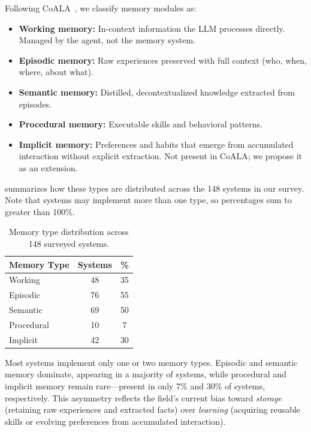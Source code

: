 Following CoALA~\cite{sumers2024coala}, we classify memory modules as:

\begin{itemize}[leftmargin=*, nosep]
    \item \textbf{Working memory:} In-context information the LLM
    processes directly. Managed by the agent, not the memory system.
    \item \textbf{Episodic memory:} Raw experiences preserved with
    full context (who, when, where, about what).
    \item \textbf{Semantic memory:} Distilled, decontextualized
    knowledge extracted from episodes.
    \item \textbf{Procedural memory:} Executable skills and
    behavioral patterns.
    \item \textbf{Implicit memory:} Preferences and habits that
    emerge from accumulated interaction without explicit extraction.
    Not present in CoALA; we propose it as an extension.
\end{itemize}

 summarizes how these types are distributed
across the 148 systems in our survey. Note that systems may implement
more than one type, so percentages sum to greater than 100\%.

\begin{table}[t]
    \centering
    \caption{Memory type distribution across 148 surveyed systems.}
    \label{tab:memory-type-dist}
    \begin{tabular}{lcc}
        \toprule
        \textbf{Memory Type} & \textbf{Systems} & \textbf{\%} \\
        \midrule
        Working      & 48 & 35 \\
        Episodic     & 76 & 55 \\
        Semantic     & 69 & 50 \\
        Procedural   & 10 &  7 \\
        Implicit     & 42 & 30 \\
        \bottomrule
    \end{tabular}
\end{table}

Most systems implement only one or two memory types.
Episodic and semantic memory dominate, appearing in a majority of
systems, while procedural and implicit memory remain rare---present in
only 7\% and 30\% of systems, respectively.
This asymmetry reflects the field's current bias toward
\emph{storage} (retaining raw experiences and extracted facts) over
\emph{learning} (acquiring reusable skills or evolving preferences from
accumulated interaction).

